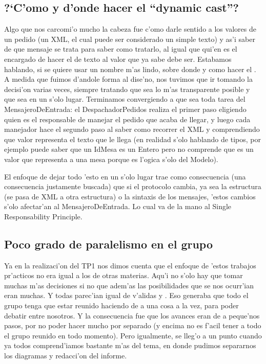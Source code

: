 \subsection{?`C'omo y d'onde hacer el ``dynamic cast''?}
Algo que nos carcomi'o mucho la cabeza fue c'omo darle sentido a los valores de un pedido (un XML, el cual puede ser considerado un simple texto) y as'i saber de que mensaje se trata para saber como tratarlo, al igual que qui'en es el encargado de hacer el  de texto al valor que ya sabe debe ser. Estabamos hablando, si se quiere usar un nombre m'as lindo, sobre donde y como hacer el . A medida que fuimos d'andole forma al dise'no, nos tuvimos que ir tomando la decisi'on varias veces, siempre tratando que sea lo m'as transparente posible y que sea en un s'olo lugar. Terminamos convergiendo a que sea toda tarea del MensajeroDeEntrada: el DespachadorPedidos realiza el primer paso eligiendo quien es el responsable de manejar el pedido que acaba de llegar, y luego cada manejador hace el segundo paso al saber como recorrer el XML y comprendiendo que valor representa el texto que le llega (en realidad s'olo hablando de tipos, por ejemplo puede saber que un IdMesa es un Entero pero no comprende que es un valor que representa a una mesa porque es l'ogica s'olo del Modelo). 

El enfoque de dejar todo 'esto en un s'olo lugar trae como consecuencia (una consecuencia justamente buscada) que si el protocolo cambia, ya sea la estructura (se pasa de XML a otra estructura) o la sintaxis de los mensajes, 'estos cambios s'olo afectar'an al MensajeroDeEntrada. Lo cual va de la mano al Single Responsability Principle.


\subsection{Poco grado de paralelismo en el grupo}
Ya en la realizaci'on del TP1 nos dimos cuenta que el enfoque de 'estos trabajos pr'acticos no era igual a los de otras materias. Aqu'i no s'olo hay que tomar muchas m'as decisiones si no que adem'as las posibilidades que se nos ocurr'ian eran muchas. Y todas parec'ian igual de v'alidas y . Eso generaba que todo el grupo tenga que estar reunido haciendo de a una cosa a la vez, para poder debatir entre nosotros. Y la consecuencia fue que los avances eran de a peque'nos pasos, por no poder hacer mucho por separado (y encima no es f'acil tener a todo el grupo reunido en todo momento). Pero igualmente, se lleg'o a un punto cuando ya todos comprend'iamos bastante m'as del tema, en donde pudimos separarnos los diagramas y redacci'on del informe. 

